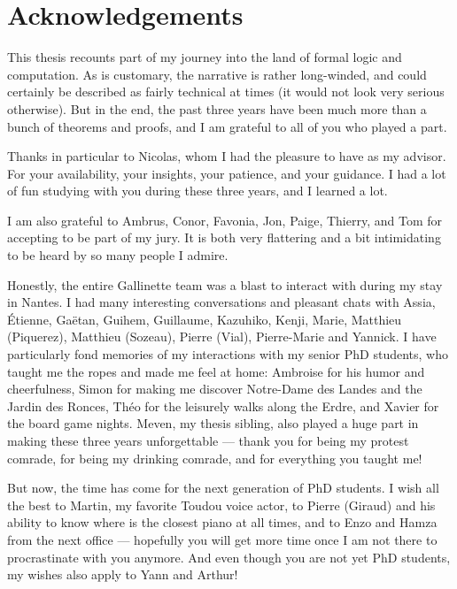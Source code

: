 \chapter*{Acknowledgements}

This thesis recounts part of my journey into the land of formal logic and computation. As 
is customary, the narrative is rather long-winded, and could certainly be 
described as fairly technical at times (it would not look very serious otherwise).
% 
But in the end, the past three years have been much more than a 
bunch of theorems and proofs, and I am grateful to all of you who played 
a part.

Thanks in particular to Nicolas, whom I had the pleasure to have as my 
advisor. For your availability, your insights, your patience, and your 
guidance. I had a lot of fun studying with you during these three years, 
and I learned a lot.

I am also grateful to Ambrus, Conor, Favonia, Jon, Paige, Thierry, and Tom 
for accepting to be part of my jury. It is both very flattering and a bit
intimidating to be heard by so many people I admire.

Honestly, the entire Gallinette team was a blast to interact with during my stay
in Nantes. I had many interesting conversations and pleasant chats with Assia, 
Étienne, Gaëtan, Guihem, Guillaume, Kazuhiko, Kenji, Marie, Matthieu (Piquerez), 
Matthieu (Sozeau), Pierre (Vial), Pierre-Marie and Yannick.
% 
I have particularly fond memories of my interactions with my senior PhD 
students, who taught me the ropes and made me feel at home: 
Ambroise for his humor and cheerfulness,
Simon for making me discover Notre-Dame des Landes and the Jardin des Ronces, 
Théo for the leisurely walks along the Erdre, and Xavier for the board
game nights. 
% 
Meven, my thesis sibling, also played a huge part in making these three years
unforgettable --- thank you for being my protest comrade, for being my
drinking comrade, and for everything you taught me!

But now, the time has come for the next generation of PhD students. I wish all the best
to Martin, my favorite Toudou voice actor, to Pierre (Giraud) and his 
ability to know where is the closest piano at all times, and to Enzo and Hamza from
the next office --- hopefully you will get more time once I am not there to 
procrastinate with you anymore.
% 
And even though you are not yet PhD students, my wishes also apply to Yann and Arthur!

